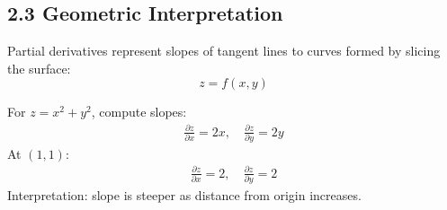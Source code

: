 \subsection*{2.3 Geometric Interpretation}

\begin{conceptbox}
    Partial derivatives represent slopes of tangent lines to curves formed by slicing the surface:
    \begin{equation*}
        z = f(x,y)
    \end{equation*}
\end{conceptbox}

\begin{examplebox}
    For $z=x^2+y^2$, compute slopes:
    \begin{align*}
        \frac{\partial z}{\partial x} = 2x, \quad \frac{\partial z}{\partial y}=2y
    \end{align*}
    At $(1,1)$:
    \begin{align*}
        \frac{\partial z}{\partial x}=2, \quad \frac{\partial z}{\partial y}=2
    \end{align*}
    Interpretation: slope is steeper as distance from origin increases.
\end{examplebox}
